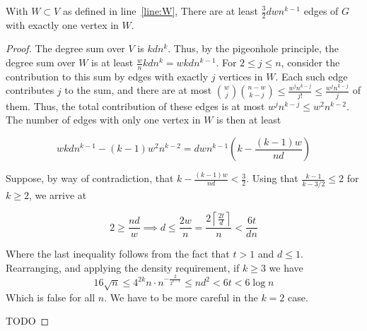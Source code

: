 
\begin{lemma}\label{many_edges}
    With $W  \subset V$ as defined in line~\ref{line:W},
    There are at least $\frac{3}{2}dwn^{k-1}$ edges of $G$ with exactly one vertex in $W$.
    \begin{proof}
        The degree sum over $V$ is $kdn^{k}$.
        Thus, by the pigeonhole principle, the degree sum over $W$ is at least
        $\frac{w}{n}kdn^{k} = wkdn^{k-1}$.
        For $2 \leq j \leq n$,
        consider the contribution to this sum by edges with exactly $j$ vertices in $W$.
        Each such edge contributes $j$ to the sum, and there are at most
        $\binom{w}{j}\binom{n-w}{k-j} \leq
        \frac{w^j n^{k-j}}{j!} \leq
        \frac{w^j n^{k-j}}{j}$ of them.
        Thus, the total contribution of these edges is at most $w^j n^{k-j} \leq w^{2}n^{k-2}$.
        The number of edges with only one vertex in $W$ is then at least

        \[
            wkdn^{k-1} - (k-1)w^{2}n^{k-2} = dwn^{k-1} \left( k - \frac{(k-1)w}{nd}\right)
        \]

        Suppose, by way of contradiction,
        that $ k - \frac{(k-1)w}{nd} < \frac{3}{2}$.
        Using that $\frac{k-1}{k-3/2} \leq 2$
        for $k \geq 2$, we arrive at

        \[
            2 \geq  \frac{nd}{w} \implies
            d \leq \frac{2w}{n} = \frac{2 \left\lceil\frac{2t}{d} \right\rceil}{n}
            < \frac{6t}{dn}
        \]

        Where the last inequality follows from the fact that $t > 1$ and $d \leq 1$.
        Rearranging, and applying the density requirement, if $k \geq 3$ we have
        \[
            16 \sqrt {n} \leq 4^{2k} n \cdot n^{-\frac{2}{2^{k-1}}} \leq nd^2 < 6t < 6 \log n
        \]
        Which is false for all $n$.
        We have to be more careful in the $k = 2$ case.

        TODO %

    \end{proof}
\end{lemma}

